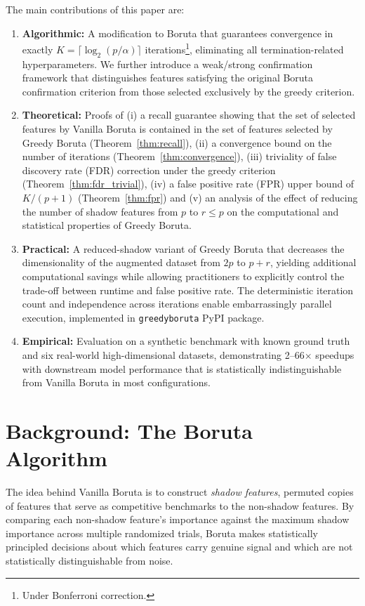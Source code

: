 \documentclass[runningheads]{llncs}
\begin{document}
\medskip 
The main contributions of this paper are:
\begin{enumerate}
    \item \textbf{Algorithmic:} A modification to Boruta that guarantees convergence in exactly $K = \lceil \log_2(p/\alpha) \rceil$ iterations\footnote{\label{fn:bonf}Under Bonferroni correction.}, eliminating all termination-related hyperparameters. We further introduce a weak/strong confirmation framework that distinguishes features satisfying the original Boruta confirmation criterion from those selected exclusively by the greedy criterion.
    \item \textbf{Theoretical:} Proofs of (i) a recall guarantee showing that the set of selected features by Vanilla Boruta is contained in the set of features selected by Greedy Boruta (Theorem~\ref{thm:recall}), (ii) a convergence bound on the number of iterations (Theorem~\ref{thm:convergence}), (iii) triviality of false discovery rate (FDR) correction under the greedy criterion (Theorem~\ref{thm:fdr_trivial}), (iv) a false positive rate (FPR) upper bound of $K/(p+1)$ (Theorem~\ref{thm:fpr}) and (v) an analysis of the effect of reducing the number of shadow features from \(p\) to \(r \leq p\) on the computational and statistical properties of Greedy Boruta.
    \item \textbf{Practical:} A reduced-shadow variant of Greedy Boruta that decreases the dimensionality of the augmented dataset from \(2p\) to \(p+r\), yielding additional computational savings while allowing practitioners to explicitly control the trade-off between runtime and false positive rate. The deterministic iteration count and independence across iterations enable embarrassingly parallel execution, implemented in \texttt{greedyboruta} PyPI package.
    \item \textbf{Empirical:} Evaluation on a synthetic benchmark with known ground truth and six real-world high-dimensional datasets, demonstrating 2--66$\times$ speedups with downstream model performance that is statistically indistinguishable from Vanilla Boruta in most configurations.
\end{enumerate}


\section{Background: The Boruta Algorithm}
\label{sec:background}

The idea behind Vanilla Boruta is to construct \emph{shadow features}, permuted copies of features that serve as competitive benchmarks to the non-shadow features. By comparing each non-shadow feature's importance against the maximum shadow importance across multiple randomized trials, Boruta makes statistically principled decisions about which features carry genuine signal and which are not statistically distinguishable from noise.
\end{document}
